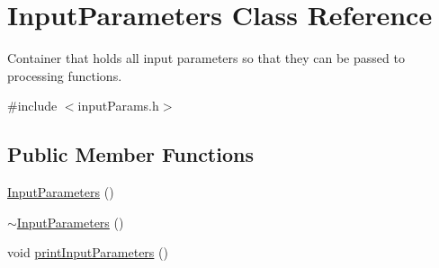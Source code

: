 \hypertarget{classInputParameters}{\section{Input\-Parameters Class Reference}
\label{classInputParameters}
}


Container that holds all input parameters so that they can be passed to processing functions.  




{\ttfamily \#include $<$input\-Params.\-h$>$}

\subsection*{Public Member Functions}
\begin{DoxyCompactItemize}
\item 
\hyperlink{classInputParameters_a2ede6d73636729561755f9ca986475f8}{Input\-Parameters} ()
\item 
\hyperlink{classInputParameters_a613b1f1641d55d578b9a6a0b25787e7b}{$\sim$\-Input\-Parameters} ()
\item 
void \hyperlink{classInputParameters_ab8e3dd3519976a005da95c3e88f86a09}{print\-Input\-Parameters} ()
\end{DoxyCompactItemize}
